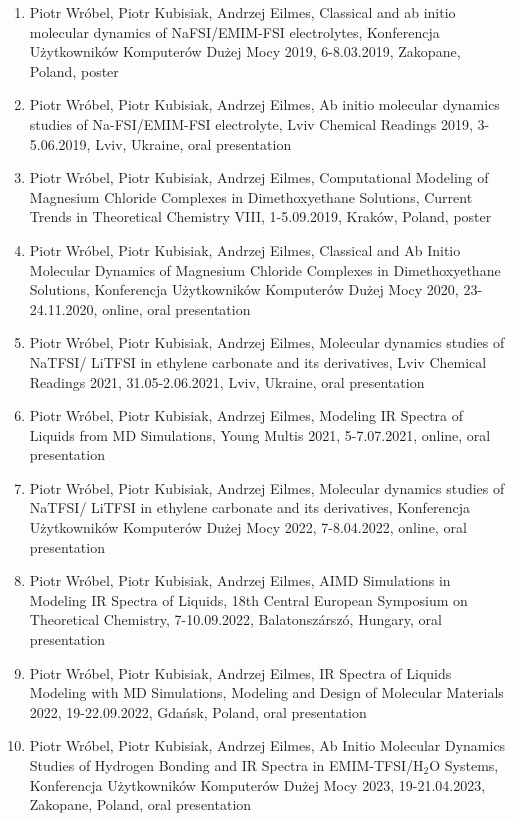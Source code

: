 
\begin{enumerate}
    \item Piotr Wróbel, Piotr Kubisiak, Andrzej Eilmes, Classical and ab initio molecular dynamics of NaFSI/EMIM-FSI electrolytes, Konferencja Użytkowników Komputerów Dużej Mocy 2019, 6-8.03.2019, Zakopane, Poland, poster
    \item Piotr Wróbel, Piotr Kubisiak, Andrzej Eilmes, Ab initio molecular dynamics studies of Na-FSI/EMIM-FSI electrolyte, Lviv Chemical Readings 2019, 3-5.06.2019, Lviv, Ukraine, oral presentation
    \item Piotr Wróbel, Piotr Kubisiak, Andrzej Eilmes, Computational Modeling of Magnesium Chloride Complexes in Dimethoxyethane Solutions, Current Trends in Theoretical Chemistry VIII, 1-5.09.2019, Kraków, Poland, poster
    \item Piotr Wróbel, Piotr Kubisiak, Andrzej Eilmes, Classical and Ab Initio Molecular Dynamics of Magnesium Chloride Complexes in Dimethoxyethane Solutions, Konferencja Użytkowników Komputerów Dużej Mocy 2020, 23-24.11.2020, online, oral presentation
    \item Piotr Wróbel, Piotr Kubisiak, Andrzej Eilmes, Molecular dynamics studies of NaTFSI/ LiTFSI in ethylene carbonate and its derivatives, Lviv Chemical Readings 2021, 31.05-2.06.2021, Lviv, Ukraine, oral presentation
    \item Piotr Wróbel, Piotr Kubisiak, Andrzej Eilmes, Modeling IR Spectra of Liquids from MD Simulations, Young Multis 2021, 5-7.07.2021, online, oral presentation
    \item Piotr Wróbel, Piotr Kubisiak, Andrzej Eilmes, Molecular dynamics studies of NaTFSI/ LiTFSI in ethylene carbonate and its derivatives, Konferencja Użytkowników Komputerów Dużej Mocy 2022, 7-8.04.2022, online, oral presentation
    \item Piotr Wróbel, Piotr Kubisiak, Andrzej Eilmes, AIMD Simulations in Modeling IR Spectra of Liquids, 18th Central European Symposium on Theoretical Chemistry, 7-10.09.2022, Balatonsz\'{a}rsz\'{o}, Hungary, oral presentation
    \item Piotr Wróbel, Piotr Kubisiak, Andrzej Eilmes, IR Spectra of Liquids Modeling with MD Simulations, Modeling and Design of Molecular Materials 2022, 19-22.09.2022, Gdańsk, Poland, oral presentation
    \item Piotr Wróbel, Piotr Kubisiak, Andrzej Eilmes, Ab Initio Molecular Dynamics Studies of Hydrogen Bonding and IR Spectra in EMIM-TFSI/H$_2$O Systems, Konferencja Użytkowników Komputerów Dużej Mocy 2023, 19-21.04.2023, Zakopane, Poland, oral presentation
\end{enumerate}